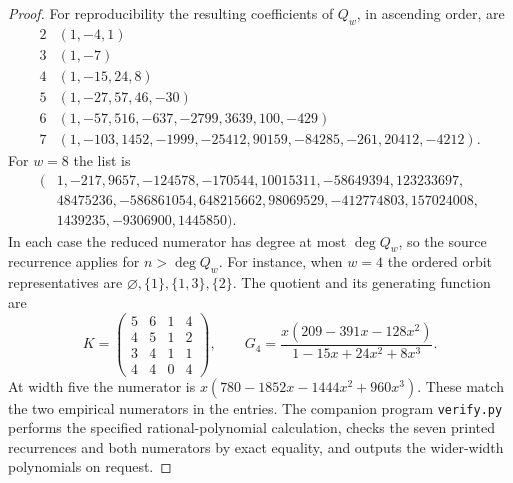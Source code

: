 \documentclass[11pt]{article}
\begin{document}
\begin{proof}
For reproducibility the resulting coefficients of $Q_w$, in ascending order, are
\[
\begin{array}{c|l}
2&(1,-4,1)\\
3&(1,-7)\\
4&(1,-15,24,8)\\
5&(1,-27,57,46,-30)\\
6&(1,-57,516,-637,-2799,3639,100,-429)\\
7&(1,-103,1452,-1999,-25412,90159,-84285,-261,20412,-4212).
\end{array}
\]
For $w=8$ the list is
\[
\begin{split}
(&1,-217,9657,-124578,-170544,10015311,-58649394,123233697,\\
 &48475236,-586861054,648215662,98069529,-412774803,157024008,\\
 &1439235,-9306900,1445850).
\end{split}
\]
In each case the reduced numerator has degree at most $\deg Q_w$, so the source recurrence applies for $n>\deg Q_w$. For instance, when $w=4$ the ordered orbit representatives are $\varnothing,\{1\},\{1,3\},\{2\}$. The quotient and its generating function are
\[
 K=\begin{pmatrix}5&6&1&4\\4&5&1&2\\3&4&1&1\\4&4&0&4\end{pmatrix},
 \qquad G_4=\frac{x(209-391x-128x^2)}{1-15x+24x^2+8x^3}.
\]
At width five the numerator is $x(780-1852x-1444x^2+960x^3)$. These match the two empirical numerators in the entries. The companion program \texttt{verify.py} performs the specified rational-polynomial calculation, checks the seven printed recurrences and both numerators by exact equality, and outputs the wider-width polynomials on request.
\end{proof}
\end{document}
